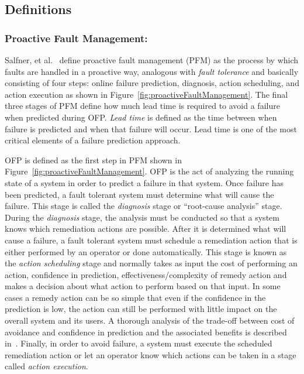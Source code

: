\subsection{Definitions} \label{definitions}
\subsubsection{Proactive Fault Management:} \label{pfm}
Salfner, et al.~\cite{salfnerSurvey} define proactive fault management (PFM) as
the process by which faults are handled in a proactive way, analogous with
\emph{fault tolerance} and basically consisting of four steps: online failure
prediction, diagnosis, action scheduling, and action execution as shown in
Figure~\ref{fig:proactiveFaultManagement}.
The final three stages of PFM define how much lead time is required to avoid a
failure when predicted during OFP.  \emph{Lead time} is defined as the time
between when failure is predicted and when that failure will occur.  Lead time
is one of the most critical elements of a failure prediction approach.

\figproactiveFaultManagement

OFP is defined as the first step in PFM shown in
Figure~\ref{fig:proactiveFaultManagement}.  OFP is the act of analyzing the
running state of a system in order to predict a failure in that system. Once
failure has been predicted, a fault tolerant system must determine what will
cause the failure.  This stage is called the \emph{diagnosis} stage or
``root-cause analysis'' stage.  During the \emph{diagnosis} stage, the analysis
must be conducted so that a system knows which remediation actions are
possible.  After it is determined what will cause a failure, a fault tolerant
system must schedule a remediation action that is either performed by an
operator or done automatically.  This stage is known as the \emph{action
scheduling} stage and normally takes as input the cost of performing an action,
confidence in prediction, effectiveness/complexity of remedy action and makes a
decision about what action to perform based on that input.  In some cases a
remedy action can be so simple that even if the confidence in the prediction is
low, the action can still be performed with little impact on the overall system
and its users.  A thorough analysis of the trade-off between cost of avoidance
and confidence in prediction and the associated benefits is described
in~\cite{candea2004microreboot}.  Finally, in order to avoid failure, a system
must execute the scheduled remediation action or let an operator know which
actions can be taken in a stage called \emph{action execution}.

